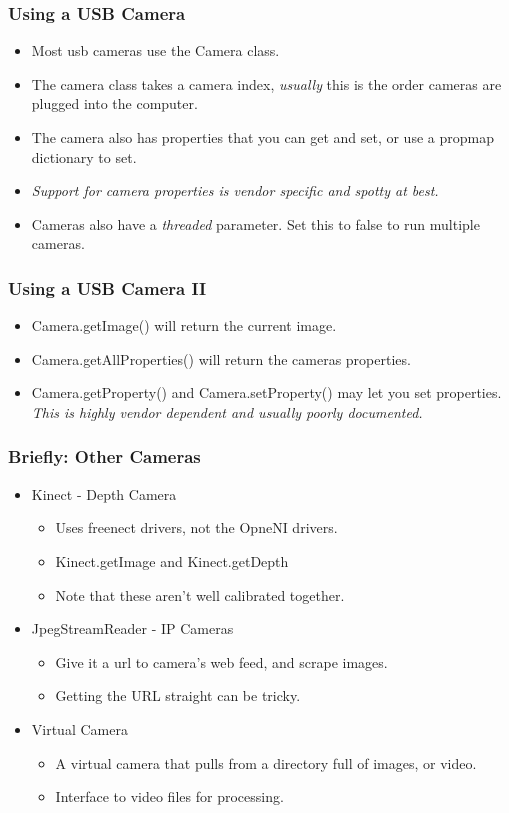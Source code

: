 \documentclass{beamer}
\begin{document}
\begin{frame}
\frametitle{Using a USB Camera}
\begin{itemize}
\item Most usb cameras use the \alert<+>{Camera} class. 
\item The camera class takes a camera index, \emph{usually} this is the
   order cameras are plugged into the computer.
\item The camera also has properties that you can get and set, or use a propmap dictionary to set. 
 \item \emph{Support for camera properties is vendor specific and spotty at
   best.} 
 \item Cameras also have a \emph{threaded} parameter. Set this to false
 to run multiple cameras. 
\end{itemize}
\end{frame}
\frametitle{Using a USB Camera II}
\begin{frame}
\begin{itemize}
\item \alert<+>{Camera.getImage()} will return the current image. 
\item \alert<+>{Camera.getAllProperties()} will return the cameras properties.
\item \alert<+>{Camera.getProperty() and Camera.setProperty()} may let
  you set properties. \emph{This is highly vendor dependent and usually poorly documented.}
\end{itemize}
\end{frame}
\begin{frame}
\frametitle{Briefly: Other Cameras}
\begin{itemize}
\item Kinect - Depth Camera
\begin{itemize}
\item Uses freenect drivers, not the OpneNI drivers.
\item \alert<+>{Kinect.getImage and Kinect.getDepth }
\item Note that these aren't well calibrated together.
\end{itemize}
\item JpegStreamReader - IP Cameras
\begin{itemize}
\item Give it a url to camera's web feed, and scrape images.
\item Getting the URL straight can be tricky. 
\end{itemize}
\item Virtual Camera
\begin{itemize}
\item A virtual camera that pulls from a directory full of images, or video.
\item Interface to video files for processing.
\end{itemize}
\end{itemize}
\end{frame}
\end{document}
